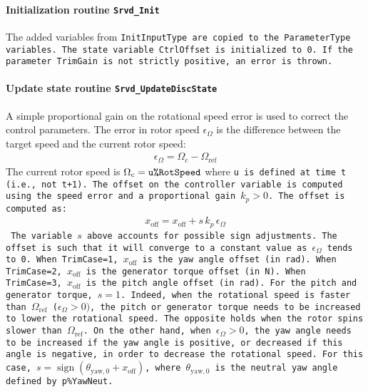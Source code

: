 \documentclass[11pt]{article}
\begin{document}
\paragraph{Initialization routine \tt{Srvd\_Init}}
The added variables from \tt{InitInputType} are copied to the \tt{ParameterType} variables.
The state variable \tt{CtrlOffset} is initialized to 0.
If the parameter \tt{TrimGain} is not strictly positive, an error is thrown.


\paragraph{Update state routine \tt{Srvd\_UpdateDiscState}}
A simple proportional gain on the rotational speed error is used to correct the control parameters.
The error in rotor speed $\epsilon_\Omega$ is the difference between the target speed and the current rotor speed:
        \begin{align}
            \epsilon_\Omega ={\Omega_c - \Omega_\text{ref}}
        \end{align}
The current rotor speed is $\Omega_c=\tt{u\%RotSpeed}$ where \tt{u} is defined at time \tt{t} (i.e., not \tt{t+1}).
        The offset on the controller variable is computed using 
        the speed error and a proportional gain $k_p>0$. The offset is computed as:
        \begin{align}
            x_\text{off} = x_\text{off} + s\, k_p\, \epsilon_\Omega \label{eq:xoffpitch}
        \end{align}
The variable $s$ above accounts for possible sign adjustments. 
The offset is such that it will converge to a constant value as $\epsilon_\Omega$ tends to 0.
When \tt{TrimCase}=1, $x_\text{off}$ is the yaw angle offset (in rad). 
When \tt{TrimCase}=2, $x_\text{off}$ is the generator torque offset (in N). 
When \tt{TrimCase}=3, $x_\text{off}$ is the pitch angle offset (in rad). 
For the pitch and generator torque, $s=1$. Indeed, when the rotational speed is faster than $\Omega_\text{ref}$ ($\epsilon_\Omega>0)$, the  pitch or generator torque needs to be increased to lower the rotational speed. The opposite holds when the rotor spins slower than $\Omega_\text{ref}$.
On the other hand, when $\epsilon_\Omega>0$, the yaw angle needs to be increased if the yaw angle is positive, or decreased if this angle is negative, in order to decrease the rotational speed. For this case, $s=\operatorname{sign}( \theta_{\text{yaw},0}+x_\text{off})$, where $\theta_{\text{yaw},0}$ is the neutral yaw angle defined by \tt{p\%YawNeut}.
\end{document}
